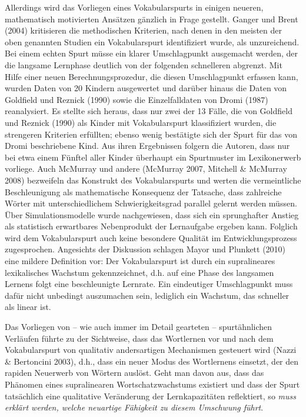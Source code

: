 \documentclass[
  letterpaper,
]{scrbook}
\begin{document}
Allerdings wird das Vorliegen eines Vokabularspurts in einigen neueren,
mathematisch motivierten Ansätzen gänzlich in Frage gestellt. Ganger und
Brent (2004) kritisieren die methodischen Kriterien, nach denen in den
meisten der oben genannten Studien ein Vokabularspurt identifiziert
wurde, als unzureichend. Bei einem echten Spurt müsse ein klarer
Umschlagpunkt ausgemacht werden, der die langsame Lernphase deutlich von
der folgenden schnelleren abgrenzt. Mit Hilfe einer neuen
Berechnungsprozedur, die diesen Umschlagpunkt erfassen kann, wurden
Daten von 20 Kindern ausgewertet und darüber hinaus die Daten von
Goldfield und Reznick (1990) sowie die Einzelfalldaten von Dromi (1987)
reanalysiert. Es stellte sich heraus, dass nur zwei der 13 Fälle, die
von Goldfield und Reznick (1990) als Kinder mit Vokabularspurt
klassifiziert wurden, die strengeren Kriterien erfüllten; ebenso wenig
bestätigte sich der Spurt für das von Dromi beschriebene Kind. Aus ihren
Ergebnissen folgern die Autoren, dass nur bei etwa einem Fünftel aller
Kinder überhaupt ein Spurtmuster im Lexikonerwerb vorliege. Auch
McMurray und andere (McMurray 2007, Mitchell \& McMurray 2008)
bezweifeln das Konstrukt des Vokabularspurts und werten die
vermeintliche Beschleunigung als mathematische Konsequenz der Tatsache,
dass zahlreiche Wörter mit unterschiedlichem Schwierigkeitsgrad parallel
gelernt werden müssen. Über Simulationsmodelle wurde nachgewiesen, dass
sich ein sprunghafter Anstieg als statistisch erwartbares Nebenprodukt
der Lernaufgabe ergeben kann. Folglich wird dem Vokabularspurt auch
keine besondere Qualität im Entwicklungsprozess zugesprochen. Angesichts
der Diskussion schlagen Mayor und Plunkett (2010) eine mildere
Definition vor: Der Vokabularspurt ist durch ein supralineares
lexikalisches Wachstum gekennzeichnet, d.h. auf eine Phase des langsamen
Lernens folgt eine beschleunigte Lernrate. Ein eindeutiger Umschlagpunkt
muss dafür nicht unbedingt auszumachen sein, lediglich ein Wachstum, das
schneller als linear ist.

Das Vorliegen von -- wie auch immer im Detail gearteten --
spurtähnlichen Verläufen führte zu der Sichtweise, dass das Wortlernen
vor und nach dem Vokabularspurt von qualitativ andersartigen Mechanismen
gesteuert wird (Nazzi \& Bertoncini 2003), d.h., dass ein neuer Modus
des Wortlernens einsetzt, der den rapiden Neuerwerb von Wörtern auslöst.
Geht man davon aus, dass das Phänomen eines supralinearen
Wortschatzwachstums existiert und dass der Spurt tatsächlich eine
qualitative Veränderung der Lernkapazitäten reflektiert, so \emph{muss
erklärt werden, welche neuartige Fähigkeit zu diesem Umschwung führt}.
\end{document}
